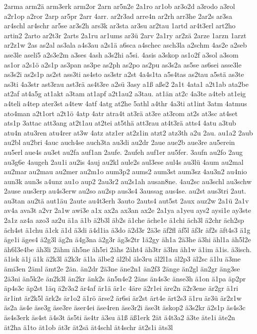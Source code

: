 {2arma
arm2ä
arm3erk
arm2or
2arn
ar5n2e
2a1ro
ar1ob
ar3o2d
a3rodo
a3rol
a2r1op
a2ror
2arp
ar5pr
2arr
4arr.
ar2r3ad
arre4n
ar2rh
arr3he
2ar2s
ar3sa
ar4schl
ar4schr
ar5se
ar3s2h
ars3k
ar3sta
ar3su
ar2tau
1artd
ar4t3erl
art2ho
artin2
2arto
ar2t3r
2arts
2a1ru
ar1ums
ar3ü
2arv
2a1ry
ar2zä
2arze
1arzn
1arzt
ar2z1w
2as
as2al
as3ala
a4s3au
a2s1ä
a6sca
a4schec
asch3la
a2schm
4as2e
a2seb
ase3le
aseli5
a2s3e2m
a3ses
4ash
a3s2hi
a5si.
4asis
a3skop
as1o2f
a3sol
a3som
as1or
a2s1ö
a2s1p
as3pan
as3pe
as2ph
as2po
as2pu
as3s2a
as5se
as6sei
asse3le
as3s2i
as2s1p
as2st
ass3ti
as4sto
as3str
a2st
4a4s1ta
a5s4tas
as2tau
a5stä
as3te
as3ti
4a3str
ast3rau
ast3rä
as4t3re
a2sü
3asy
a1ß
aße2
2a1t
4ata1
a2t1ab
ata2be
at2af
at4a5g
at1akt
a3tam
at1apf
a2t1au2
a3tau.
at1än
at2c
4a3te
a4teb
at1eig
a4teli
a4tep
ater3st
a4tew
4atf
4atg
at2he
5athl
a4thr
4a3ti
at1int
3atm
4atmus
ato4man
a2t1ort
a2t1ö
4atp
4atr
atra4t
at3rä
at3re
at3rom
at2s
at3sc
at4set
ats1p
3attac
att3ang
at2t1au
at2tei
at5thä
att3rau
at4t3rä
atts4
4atu
a3tub
atu4n
atu3ren
atu4rer
at3w
4atz
atz1er
at2z1in
atzt2
atz3th
a2u
2au.
au1a2
2aub
au2bl
au2bri
4auc
auch4se
auch3ta
au3di
au2dr
2aue
aue2b
aue3re
au5erein
au5erl
aue4s
au3et
au2fa
auf1an
2aufe.
2aufeh
auf1er
au5fer.
3aufn
au2fo
2aug
au3g6e
4augeh
2au1i
au2is
4auj
au2kl
aule2s
aul3ese
aul4s
au3lü
4aum
au2mal
au2mar
au2mau
au2mer
au2m1o
aum3p2
aums2
aum3st
aum3sz
4au3n2
au4nio
aun3k
aun3s
a4unz
au1o
aup2
2au3r2
au2s1ah
ausan8ne.
4au2sc
au3schl
au3schw
2ause
aus3erp
au4s3erw
au2so
au2sp
aus3s4
3aussag
aus4se.
au2st
aus3tri
2aut.
au3tan
au2tä
aut1äu
2aute
au4t3erh
3auto
2auts4
aut5st
2aux
auz2w
2a1ü
2a1v
av4a
ava3t
a2vr
2a1w
awi3e
a1x
ax2a
ax3an
ax2e
2a1ya
a1yeu
ays2
aysi1e
ay3ste
2a1z
az4a
azo3
az2u
ä1a
ä1b
ä2b3l
äb2s
ä1che
äche1e
ä1chi
äch3l
ä2chr
äch2sp
äch4st
ä1chu
ä1ck
ä1d
ä3di
ä4d1ia
ä3do
ä2d3r
2ä3e
äf2fl
äf5l
äf3r
äf2s
äft4s3
ä1g
äge1i
äges4
ä2g3l
äg2n
ä4g3na
ä2g3r
äg3s2tr
1ä2gy
äh1a
2ä3he
ä3hi
ähl1a
äh5l2e
äh6l3e4be
äh3li
2ähm
äh5ne
äh5ri
2ähs
2äht4
äh3tr
ä3hu
äh1w
ä1im
ä1is.
ä3isch.
ä1isk
ä1j
ä1k
ä2k3l
ä2k3r
ä1la
älbe2
äl2bl
äle3ru
äl2l1a
äl2p3
äl2sc
ä1lu
ä3me
ämi3en
2äml
ämt2e
2än.
än2dr
2ä3ne
äne2n1
än2f3
2änge
än2gl
än2gr
äng3se
2ä3ni
än5k2e
än2k3l
än2kr
änk2s
än5n4e2
2äns
än4s3c
änse3h
ä1on
ä1pa
äp2pr
äp4s3c
äp2st
1äq
ä2r3a2
är4af
är1ä
är1c
4äre
ä2r1ei
äre2n
ä2r3ene
är2gr
ä1ri
är1int
är2k5l
ärk2s
är1o2
ä1rö
ärse2
är6si
är2st
ärt4e
ärt2s3
ä1ru
är3ü
är2z1w
äs2a
äs4e
äse3g
äse3re
äser4ei
äse4ren
äse3r2i
äse3t
äskop2
ä3s2kr
ä2s1p
äs4s3c
äs4s3erk
äs4st
ä4s3t
äs5ti
äs4tr
ä3su
ä1ß
äß1erk
2ät
ä4t3a2
ä3te
äte1i
äte2n
ät2ha
ä1to
ät1ob
ät3r
ät2sä
ät4schl
ät4schr
ät2s1i
äts3l
}
